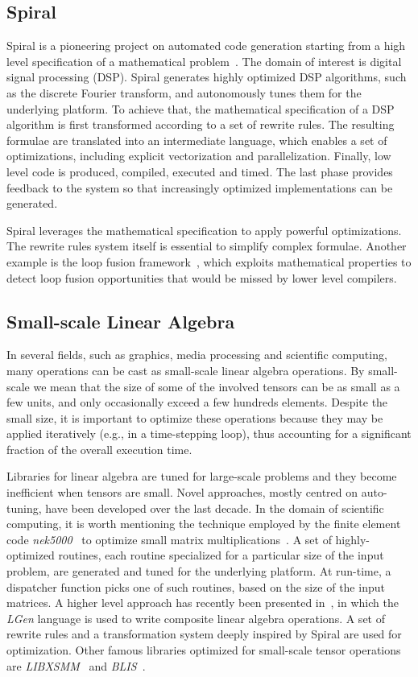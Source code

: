 \subsection{Spiral}
Spiral is a pioneering project on automated code generation starting from a high level specification of a mathematical problem~\citep{Pueschel:05}. The domain of interest is digital signal processing (DSP). Spiral generates highly optimized DSP algorithms, such as the discrete Fourier transform, and autonomously tunes them for the underlying platform. To achieve that, the mathematical specification of a DSP algorithm is first transformed according to a set of rewrite rules. The resulting formulae are translated into an intermediate language, which enables a set of optimizations, including explicit vectorization and parallelization. Finally, low level code is produced, compiled, executed and timed. The last phase provides feedback to the system so that increasingly optimized implementations can be generated. 

Spiral leverages the mathematical specification to apply powerful optimizations. The rewrite rules system itself is essential to simplify complex formulae. Another example is the loop fusion framework~\citep{spiral-fusion}, which exploits mathematical properties to detect loop fusion opportunities that would be missed by lower level compilers.


\subsection{Small-scale Linear Algebra}
In several fields, such as graphics, media processing and scientific computing, many operations can be cast as small-scale linear algebra operations. By small-scale we mean that the size of some of the involved tensors can be as small as a few units, and only occasionally exceed a few hundreds elements. Despite the small size, it is important to optimize these operations because they may be applied iteratively (e.g., in a time-stepping loop), thus accounting for a significant fraction of the overall execution time. 

Libraries for linear algebra are tuned for large-scale problems and they become inefficient when tensors are small. Novel approaches, mostly centred on auto-tuning, have been developed over the last decade. In the domain of scientific computing, it is worth mentioning the technique employed by the finite element code {\em nek5000}~\citep{nek5000-web-page} to optimize small matrix multiplications~\citep{nek5000}. A set of highly-optimized routines, each routine specialized for a particular size of the input problem, are generated and tuned for the underlying platform. At run-time, a dispatcher function picks one of such routines, based on the size of the input matrices. A higher level approach has recently been presented in~\cite{Spampinato:14}, in which the {\em LGen} language is used to write composite linear algebra operations. A set of rewrite rules and a transformation system deeply inspired by Spiral are used for optimization. Other famous libraries optimized for small-scale tensor operations are {\em LIBXSMM}~\citep{libxsmm} and {\em BLIS}~\citep{blis}.

